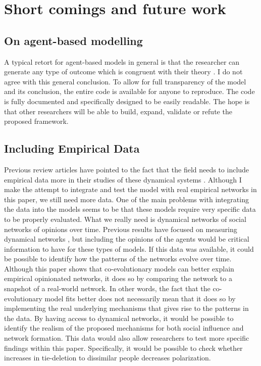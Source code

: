 \documentclass{article}
\begin{document}
\section{Short comings and future work}

\subsection{On agent-based modelling}
A typical retort for agent-based models in general is that the researcher can generate any type of outcome which is congruent with their theory \cite{geschke2019triple}. 
I do not agree with this general conclusion. To allow for full transparency of the model and its conclusion, the entire code is available for anyone to reproduce. The code is fully documented and specifically designed to be easily readable.
The hope is that other researchers will be able to build, expand, validate or refute the proposed framework.


\subsection{Including Empirical Data}

Previous review articles have pointed to the fact that the field needs to include empirical data more in their studies of these dynamical systems \cite{flache_models_2017,noorazar_classical_2020,sirbu2017opinion}. Although I make the attempt to integrate and test the model with real empirical networks in this paper, we still need more data. One of the main problems with integrating the data into the models seems to be that these models require very specific data to be properly evaluated. What we really need is dynamical networks of social networks of opinions over time. Previous results have focused on measuring dynamical networks \cite{kossinets_origins_2009}, but including the opinions of the agents would be critical information to have for these types of models. If this data was available, it could be possible to identify how the patterns of the networks evolve over time. Although this paper shows that co-evolutionary models can better explain empirical opinionated networks, it does so by comparing the network to a snapshot of a real-world network. In other words, the fact that the co-evolutionary model fits better does not necessarily mean that it does so by implementing the real underlying mechanisms that gives rise to the patterns in the data. By having access to dynamical networks, it would be possible to identify the realism of the proposed mechanisms for both social influence and network formation. This data would also allow researchers to test more specific findings within this paper. Specifically, it would be possible to check whether increases in tie-deletion to dissimilar people decreases polarization. 
\end{document}
